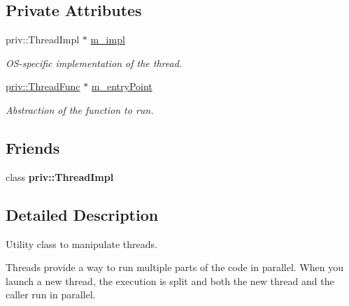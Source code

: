 \subsection*{Private Attributes}
\begin{DoxyCompactItemize}
\item 
\mbox{\label{classsf_1_1_thread_ac6d215423182b4e8c18db34ea6ae51fc}} 
priv\+::\+Thread\+Impl $\ast$ \mbox{\hyperlink{classsf_1_1_thread_ac6d215423182b4e8c18db34ea6ae51fc}{m\+\_\+impl}}
\begin{DoxyCompactList}\small\item\em O\+S-\/specific implementation of the thread. \end{DoxyCompactList}\item 
\mbox{\label{classsf_1_1_thread_a8326ed80dfffb6a0d92560a86a665b4d}} 
\mbox{\hyperlink{structpriv_1_1_thread_func}{priv\+::\+Thread\+Func}} $\ast$ \mbox{\hyperlink{classsf_1_1_thread_a8326ed80dfffb6a0d92560a86a665b4d}{m\+\_\+entry\+Point}}
\begin{DoxyCompactList}\small\item\em Abstraction of the function to run. \end{DoxyCompactList}\end{DoxyCompactItemize}
\subsection*{Friends}
\begin{DoxyCompactItemize}
\item 
\mbox{\label{classsf_1_1_thread_a5ed4f3acfcb44de47de196437c39f9ef}} 
class {\bfseries priv\+::\+Thread\+Impl}
\end{DoxyCompactItemize}


\subsection{Detailed Description}
Utility class to manipulate threads. 

\begin{DoxyVerb}\end{DoxyVerb}


Threads provide a way to run multiple parts of the code in parallel. When you launch a new thread, the execution is split and both the new thread and the caller run in parallel.

